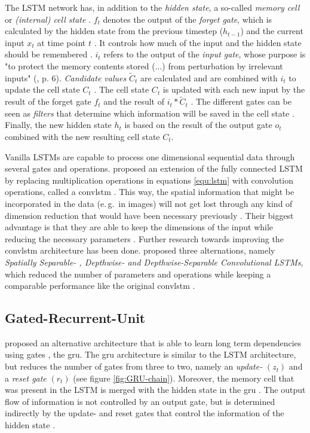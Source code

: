 \documentclass[11pt,
  paper=a4, 
  bibliography=totocnumbered,
	captions=tableheading,
	BCOR=10mm
]{scrreprt}
\theoremstyle{definition}
\newcommand{\eg}{e.\,g.~}
\begin{document}
The LSTM network has, in addition to the \textit{hidden state}, a so-called \textit{memory cell} \cite{Hochreiter1997} or \textit{(internal) cell state} \cite{Valipour2017, Skansi2018, Lee2017, Yurdakul2017}.
$f_t$ denotes the output of the \textit{forget gate}, which is calculated by the hidden state from the previous timestep ($h_{t-1}$) and the current input $x_t$ at time point $t$ \cite{Lee2017}.
It controls how much of the input and the hidden state should be remembered \cite{Skansi2018}.
$i_t$ refers to the output of the \textit{input gate}, whose purpose is "to protect the memory contents stored (...) from perturbation by irrelevant inputs" (\cite{Hochreiter1997}, p. 6).
\textit{Candidate values} $\widetilde{C}_t$ are calculated and are combined with $i_t$ to update the cell state $C_t$ \cite{Hochreiter1997,Chung2014}.
The cell state $C_t$ is updated with each new input by the result of the forget gate $f_t$ and the result of $i_t * \widetilde{C}_t$ \cite{Chung2014}.
The different gates can be seen as \textit{filters} that determine which information will be saved in the cell state \cite{Skansi2018}.
Finally, the new hidden state $h_t$ is based on the result of the output gate $o_t$ combined with the new resulting cell state $C_t$.

Vanilla LSTMs are capable to process one dimensional sequential data through several gates and operations.
\textcite{Shi2015} proposed an extension of the fully connected LSTM by replacing multiplication operations in equations \ref{equ:lstm} with convolution operations, called a \gls{convlstm} \cite{Yurdakul2017, Nabavi2018}.
This way, the spatial information that might be incorporated in the data (\eg in images) will not get lost through any kind of dimension reduction that would have been necessary previously \cite{Shi2015}.
Their biggest advantage is that they are able to keep the dimensions of the input while reducing the necessary parameters \cite{Pfeuffer2_2019}.
Further research towards improving the \gls{convlstm} architecture has been done.
\textcite{Pfeuffer2_2019} proposed three alternations, namely \textit{Spatially Separable- , Depthwise- and Depthwise-Separable Convolutional LSTMs}, 
which reduced the number of parameters and operations while keeping a comparable performance like the original \gls{convlstm}  \cite{Pfeuffer2_2019}.

\subsection{Gated-Recurrent-Unit} \label{sec:GRU}
\textcite{Cho2014} proposed an alternative architecture that is able to learn long term dependencies using gates \cite{Chung2014}, the \gls{gru}.
The \gls{gru} architecture is similar to the LSTM architecture, but reduces the number of gates from three to two, namely an \textit{update-} $(z_t)$ and a \textit{reset gate} $(r_t)$ \cite{Dey2017} (see figure \ref{fig:GRU-chain}).
Moreover, the memory cell that was present in the LSTM is merged with the hidden state in the \gls{gru} \cite{Olah2015}.
The output flow of information is not controlled by an output gate, but is determined indirectly by the update- and reset gates that control the information of the hidden state \cite{Siam2018}.
\end{document}
